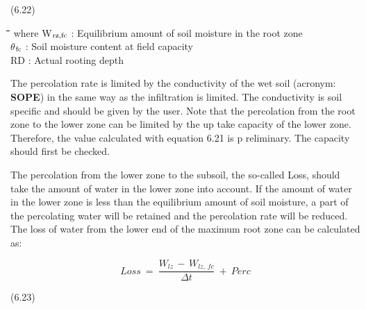\documentclass[11pt]{article}
\begin{document}
 \bigskip
\strut\hfill (6.22)
\nwln
\begin{tabbing}
\hspace{1.27cm}\=\hspace{1.27cm}\=\hspace{1.27cm}\=\hspace{1.27cm}\=%
\hspace{1.27cm}\=\hspace{1.27cm}\=\hspace{1.27cm}\=\hspace{1.27cm}\=%
\hspace{1.27cm}\=\hspace{1.27cm}\=\kill
where\> W$_{{\rm rz,fc}}$\> : Equilibrium amount of soil moisture in the root zone\> \> \> \> \> \> \> \> [cm]\\
\>$\theta$$_{{\rm fc}}$\> : Soil moisture content at field capacity\> \> \> \> \> \> \> \> [cm$^{{\rm 3}}$ cm$^{{\rm -3}}$]\\
\>RD\> : Actual rooting depth\> \> \> \> \> \> \> \> [cm]
\end{tabbing}

\bigskip
\bigskip
The percolation rate is limited by the conduc\-tivity of the wet soil (acronym: {\bf SOPE}) in the
same way as the infiltration is limited. The conductivity is soil specific and should be
given by the user. Note that the percolation from the root zone to the lower zone can be
limited by the up take capacity of the lower zone. Therefore, the value calculated with 
equation 6.21 is p reliminary. The capacity should first be checked.

\bigskip
\bigskip
The percolation from the lower zone to the subsoil, the so-called Loss, should take the
amount of water in the lower zone into account. If the amount of water in the lower zone
is less than the equilibrium amount of soil moisture, a part of the percolating water will
be retained and the percolation rate will be reduced. The loss of water from the lower end
of the maximum root zone can be calculated as:

\begin{displaymath}
Loss ~=~{\frac{W _{lz} \, -\, W _{lz,\, fc} }{\Delta t}} ~+~ Perc
\end{displaymath}

 \bigskip
\strut\hfill (6.23)
\end{document}
